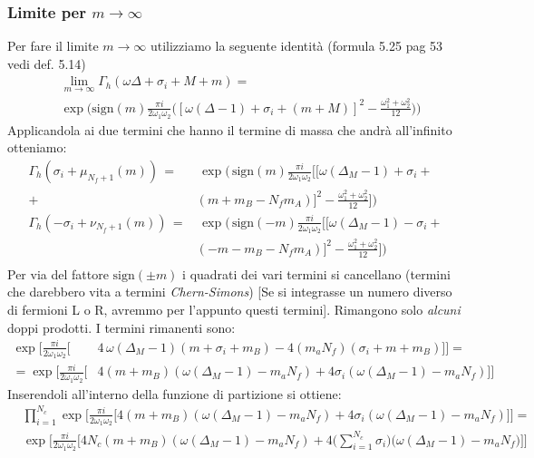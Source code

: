 \documentclass[a4paper,12pt]{article}
\newcommand{\sign}{\mbox{sign}}
\begin{document}
\subsubsection{Limite per $m \rightarrow \infty$}
Per fare il limite $m \rightarrow \infty$ utilizziamo la seguente identità \citep{Aharony:2013dha} (formula 5.25 pag 53 vedi def. 5.14)
\begin{align*}
 &\lim_{ m \rightarrow \infty } \Gamma_h ( \omega \Delta + \sigma_i + M + m) = \\
& \exp \bigg( \mbox{sign} (m) \frac{\pi i }{2 \omega_1 \omega_2} \bigg( [ \omega (\Delta
 -1) + \sigma_i + (m+M)]^2 - \frac{\omega_1^2 + \omega_2^2}{12} \bigg) \bigg)
\end{align*} 
Applicandola ai due termini che hanno il termine di massa che andrà all'infinito otteniamo:
\begin{align*}
\Gamma_h ( \sigma_i + \mu_{N_f+1}(m)) \, = &\, \exp \bigg( \, \mbox{sign}(m) \frac{\pi i}{2 \omega_1 \omega_2 } \big[ [ \omega (\Delta_M - 1) + \sigma_i + \\
+ & ( m + m_B - N_f m_A)]^2 - \frac{ \omega_1^2 + \omega_2^2 }{12} \big] \bigg )\\
\Gamma_h ( - \sigma_i + \nu_{N_f+1}(m)) \, = &\, \exp \bigg( \, \mbox{sign}(-m) \frac{\pi i}{2 \omega_1 \omega_2 } \big[ [ \omega (\Delta_M - 1) - \sigma_i + \\
&( - m - m_B - N_f m_A)]^2 - \frac{ \omega_1^2 + \omega_2^2 }{12} \big] \bigg )\\
\end{align*}
Per via del fattore $\sign(\pm m)$ i quadrati dei vari termini si cancellano (termini che darebbero vita a termini \emph{Chern-Simons})
[Se si integrasse un numero diverso di fermioni L o R, avremmo per l'appunto questi termini]. Rimangono solo \emph{alcuni} doppi prodotti. I termini rimanenti sono:
\begin{align*}
\exp \bigg[ \frac{\pi i}{2 \omega_1 \omega_2 } \bigg[& 4 \,  \omega (\Delta_M - 1) ( m + \sigma_i + m_B )  - 4 ( m_a N_f) ( \sigma_i + m + m_B) \bigg] \bigg]  = \\
 = \exp \bigg[ \frac{\pi i}{2 \omega_1 \omega_2 } \bigg[& 4  ( m  + m_B ) ( \omega (\Delta_M - 1) -  m_a N_f ) + 	4 \sigma_i  (\omega (\Delta_M - 1) -  m_a N_f)  \bigg] \bigg]
\end{align*}
Inserendoli all'interno della funzione di partizione si ottiene:
\begin{align*}
 &\prod_{i=1}^{N_c} \exp \bigg[ \frac{\pi i}{2 \omega_1 \omega_2 } \bigg[ 4  ( m  + m_B ) ( \omega (\Delta_M - 1) -  m_a N_f ) + 	4 \sigma_i  (\omega (\Delta_M - 1) -  m_a N_f)\bigg] \bigg] = \\
 &\exp \bigg[ \frac{\pi i}{2 \omega_1 \omega_2 } \bigg[ 4 N_c  ( m  + m_B ) ( \omega (\Delta_M - 1) -  m_a N_f ) +4\big( \sum_{i=1}^{N_c}	 \sigma_i  \big) \big(\omega (\Delta_M - 1) -  m_a N_f \big)  \bigg] \bigg] \\
\end{align*}
\end{document}
